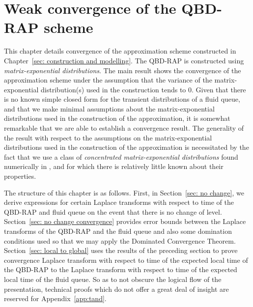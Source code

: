\chapter{Weak convergence of the QBD-RAP scheme\label{sec: conv}}
This chapter details convergence of the approximation scheme constructed in Chapter~\ref{sec: construction and modelling}. The QBD-RAP is constructed using \emph{matrix-exponential distributions}. The main result shows the convergence of the approximation scheme under the assumption that the variance of the matrix-exponential distribution(s) used in the construction tends to 0. Given that there is no known simple closed form for the transient distributions of a fluid queue, and that we make minimal assumptions about the matrix-exponential distributions used in the construction of the approximation, it is somewhat remarkable that we are able to establish a convergence result. The generality of the result with respect to the assumptions on the matrix-exponential distributions used in the construction of the approximation is necessitated by the fact that we use a class of \emph{concentrated matrix-exponential distributions} found numerically in \citep{hhat2020}, and for which there is relatively little known about their properties.

The structure of this chapter is as follows. First, in Section~\ref{sec: no change}, we derive expressions for certain Laplace transforms with respect to time of the QBD-RAP and fluid queue on the event that there is no change of level. Section~\ref{sec: no change convergence} provides error bounds between the Laplace transforms of the QBD-RAP and the fluid queue and also some domination conditions used so that we may apply the Dominated Convergence Theorem. Section~\ref{sec: local to global} uses the results of the preceding section to prove convergence Laplace transform with respect to time of the expected local time of the QBD-RAP to the Laplace transform with respect to time of the expected local time of the fluid queue. So as to not obscure the logical flow of the presentation, technical proofs which do not offer a great deal of insight are reserved for Appendix~\ref{app:tand}.

